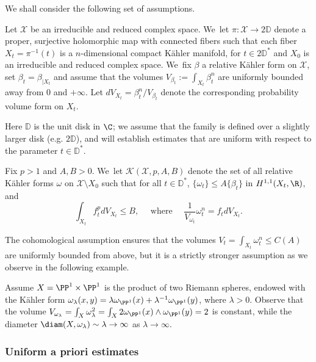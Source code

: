 We shall consider the following set of assumptions.

\begin{setting} \label{set}
Let $\mathcal{X}$ be an irreducible and reduced complex space. We~let $\pi:{\mathcal X} \rightarrow 2 \mathbb D$
denote a proper, surjective holomorphic map with connected fibers such that each fiber $X_t=\pi^{-1}(t)$ is a $n$-dimensional
compact Kähler manifold, for $t\in 2 \mathbb D^*$ and $X_0$ is an irreducible and reduced complex space. We~fix $\beta$ a relative Kähler form on $\mathcal{X}$, set $\beta_t=\beta_{|X_t}$ and assume that the volumes $V_{\beta_t}:=\int_{X_t} \beta_t^n$ are uniformly bounded away from 0 and $+ \infty $. Let $dV_{X_t}=\beta_t^n /V_{\beta_t}$ denote the corresponding probability volume form on $X_t$.
\end{setting}

Here $\mathbb D$ is the unit disk in $\C$; we assume that the family is defined over a slightly larger disk
(e.g. $2 \mathbb D$), and will establish estimates that are uniform with respect to the parameter $t \in \mathbb D^*$.

\begin{defi}
Fix $p>1$ and $A,B>0$. We~let ${\mathcal K}(\mathcal{X},p,A,B)$ denote the set of all relative Kähler forms $\omega$ on
$\mathcal{X}\setminus X_0$ such that for all $t \in \mathbb D^*$, $\{\omega_t\}\leq A\{\beta_t\}$ in $H^{1,1}(X_t,\R)$, and
\[
\int_{X_t} f_t^p dV_{X_t} \leq B,
\quad \text{ where } \quad
\frac{1}{V_{\omega_t}} \omega_t^n=f_t dV_{X_t}.
\]
\end{defi}

The cohomological assumption
ensures that the volumes $V_t=\int_{X_t} \omega_t^n \leq C(A)$ are uniformly bounded from above,
but it is a strictly stronger assumption as we observe in the following example.

\begin{exa} \label{exa:voldiam}
Assume ${X}=\PP^1 \times \PP^1$ is the product of two Riemann spheres, endowed with the
Kähler form $\omega_{\lambda}(x,y)=\lambda \omega_{\PP^1}(x)+\lambda^{-1} \omega_{\PP^1}(y)$,
where $\lambda>0$. Observe that the volume
$
V_{\omega_{\lambda}}=\int_X \omega_{\lambda}^2=\int_X 2 \omega_{\PP^1}(x) \wedge \omega_{\PP^1}(y)=2
$
is constant, while the diameter
$\diam(X,\omega_{\lambda}) \sim \lambda \rightarrow \infty$ as $\lambda \rightarrow \infty$.
\end{exa}

\subsubsection{Uniform a priori estimates}

